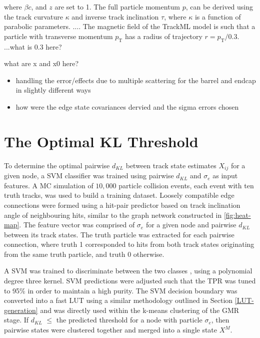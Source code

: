 where $\beta c$, and $z$ are set to 1. The full particle momentum $p$, can be derived using the track curvature $\kappa$ and inverse track inclination $\tau$, where $\kappa$ is a function of parabolic parameters. .... The magnetic field of the TrackML model is such that a particle with transverse momentum $p_\text{T}$ has a radius of trajectory $r = p_\text{T} / 0.3 $. ...what is 0.3 here?

what are x and x0 here? 


\begin{itemize}
\item handling the error/effects due to multiple scattering for the barrel and endcap in slightly different ways
\item how were the edge state covariances dervied and the sigma errors chosen
\end{itemize}





\section{The Optimal KL Threshold}
\label{chapter-6-kl-threshold}

To determine the optimal pairwise $d_{KL}$ between track state estimates $X_{ij}$ for a given node, a SVM classifier was trained using pairwise $d_{KL}$ and $\sigma_{e}$ as input features. A MC simulation of $10,000$ particle collision events, each event with ten truth tracks, was used to build a training dataset. Loosely compatible edge connections were formed using a hit-pair predictor based on track inclination angle of neighbouring hits, similar to the graph network constructed in \ref{fig:heat-map}. The feature vector was comprised of $\sigma_{e}$ for a given node and pairwise $d_{KL}$ between its track states. The truth particle was extracted for each pairwise connection, where truth 1 corresponded to hits from both track states originating from the same truth particle, and truth 0 otherwise. 


A SVM was trained to discriminate between the two classes \cite{scikit-learn}, using a polynomial degree three kernel. SVM predictions were adjusted such that the TPR was tuned to 95\% in order to maintain a high purity. The SVM decision boundary was converted into a fast LUT using a similar methodology outlined in Section \ref{LUT-generation} and was directly used within the k-means clustering of the GMR stage. If $d_{KL}$ $\leq$ the predicted threshold for a node with particle $\sigma_e$, then pairwise states were clustered together and merged into a single state $X^M$.

